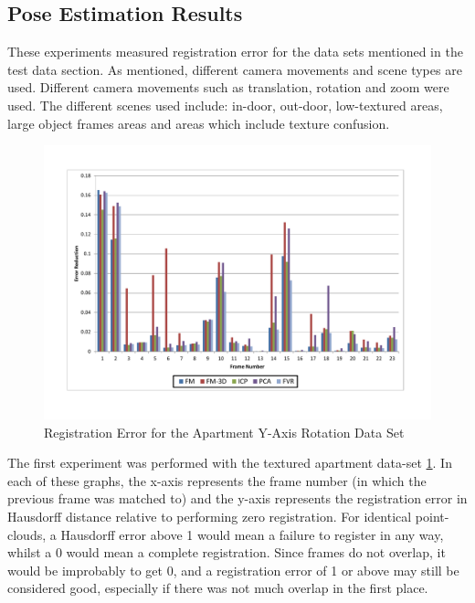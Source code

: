 \subsection{Pose Estimation Results}

These experiments measured registration error for the data sets mentioned in the test data section. As mentioned, different camera movements and scene types are used. Different camera movements such as translation, rotation and zoom were used. The different scenes used include: in-door, out-door, low-textured areas, large object frames areas and areas which include texture confusion. \\


\begin{figure}[t]
\centering
\includegraphics[width=6.0in]{images/results/Apartment_Texture_Rotate}
\caption{Registration Error for the Apartment Y-Axis Rotation Data Set}
\label{fig:PET0}
\end{figure}

The first experiment was performed with the textured apartment data-set \ref{fig:PET0}. In each of these graphs, the x-axis represents the frame number (in which the previous frame was matched to) and the y-axis represents the registration error in Hausdorff distance relative to performing zero registration. For identical point-clouds, a Hausdorff error above 1 would mean a failure to register in any way, whilst a 0 would mean a complete registration. Since frames do not overlap, it would be improbably to get 0, and a registration error of 1 or above may still be considered good, especially if there was not much overlap in the first place. \\


